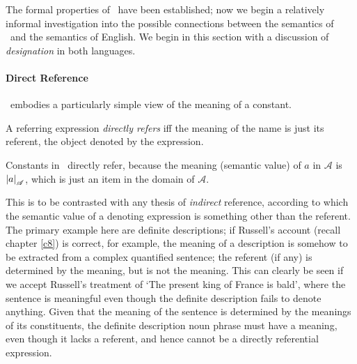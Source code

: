 The formal properties of \ltwo\ have been established; now we begin a relatively informal investigation into the possible connections between the semantics of \ltwo\ and the semantics of English.
We begin in this section with a discussion of \emph{designation} in both languages.

\paragraph{Direct Reference}
\ltwo\ embodies a particularly simple view of the meaning of a constant.
 \begin{definition}
 	A referring expression \emph{directly refers} iff the meaning of the name is just its referent, the object denoted by the expression.
 \end{definition}	
Constants in \ltwo\ directly refer, because the meaning (semantic value) of $a$ in $\mathscr{A}$ is $\left|a\right|_{\mathscr{A}}$, which is just an item in the domain of $\mathscr{A}$.


This is to be contrasted with any thesis of \emph{indirect} reference, according to which the semantic value of a denoting expression is something other than the referent. The primary example here are definite descriptions; if Russell's account (recall chapter \ref{c8}) is correct, for example,  the meaning of a description is somehow to be extracted from a complex quantified sentence; the referent (if any) is determined by the meaning, but is not the meaning. This can clearly be seen if we accept Russell's treatment of ‘The present king of France is bald’, where the sentence is meaningful even though the definite description fails to denote anything. Given that the meaning of the sentence is determined by the meanings of its constituents, the definite description noun phrase must have a meaning, even though it lacks a referent, and hence cannot be a directly referential expression.



